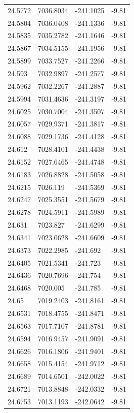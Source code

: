 \begin{table}[H]
\begin{tabular}{llll}
24.5772 & 7036.8034 & -241.1025 & -9.81 \\
24.5804 & 7036.0408 & -241.1336 & -9.81 \\
24.5835 & 7035.2782 & -241.1646 & -9.81 \\
24.5867 & 7034.5155 & -241.1956 & -9.81 \\
24.5899 & 7033.7527 & -241.2266 & -9.81 \\
24.593 & 7032.9897 & -241.2577 & -9.81 \\
24.5962 & 7032.2267 & -241.2887 & -9.81 \\
24.5994 & 7031.4636 & -241.3197 & -9.81 \\
24.6025 & 7030.7004 & -241.3507 & -9.81 \\
24.6057 & 7029.9371 & -241.3817 & -9.81 \\
24.6088 & 7029.1736 & -241.4128 & -9.81 \\
24.612 & 7028.4101 & -241.4438 & -9.81 \\
24.6152 & 7027.6465 & -241.4748 & -9.81 \\
24.6183 & 7026.8828 & -241.5058 & -9.81 \\
24.6215 & 7026.119 & -241.5369 & -9.81 \\
24.6247 & 7025.3551 & -241.5679 & -9.81 \\
24.6278 & 7024.5911 & -241.5989 & -9.81 \\
24.631 & 7023.827 & -241.6299 & -9.81 \\
24.6341 & 7023.0628 & -241.6609 & -9.81 \\
24.6373 & 7022.2985 & -241.692 & -9.81 \\
24.6405 & 7021.5341 & -241.723 & -9.81 \\
24.6436 & 7020.7696 & -241.754 & -9.81 \\
24.6468 & 7020.005 & -241.785 & -9.81 \\
24.65 & 7019.2403 & -241.8161 & -9.81 \\
24.6531 & 7018.4755 & -241.8471 & -9.81 \\
24.6563 & 7017.7107 & -241.8781 & -9.81 \\
24.6594 & 7016.9457 & -241.9091 & -9.81 \\
24.6626 & 7016.1806 & -241.9401 & -9.81 \\
24.6658 & 7015.4154 & -241.9712 & -9.81 \\
24.6689 & 7014.6501 & -242.0022 & -9.81 \\
24.6721 & 7013.8848 & -242.0332 & -9.81 \\
24.6753 & 7013.1193 & -242.0642 & -9.81 \\

\end{tabular}
\end{table}
